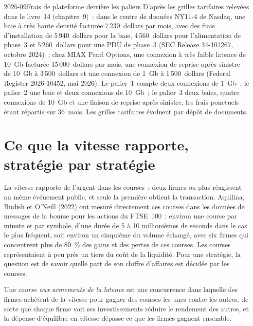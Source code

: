 \begin{dated}{2026-09}{Frais de plateforme derrière les paliers}\label{dat:fm:technology-strategy:fees}
D'après les grilles tarifaires relevées dans le livre~14 (chapitre~9)~: dans le centre de données NY11-4 de Nasdaq, une baie à très haute densité facturée 7\,230~dollars par mois,
avec des frais d'installation de 5\,940~dollars pour la baie, 4\,560~dollars pour l'alimentation de phase~3 et 5\,260~dollars pour une PDU de phase~3 (SEC Release 34-101267, octobre
2024)~; chez MIAX Pearl Options, une connexion à très faible latence de 10~Gb facturée 15\,000~dollars par mois, une connexion de reprise après sinistre de 10~Gb à 3\,500~dollars et une connexion de 1~Gb
à 1\,500~dollars (Federal Register 2026-10452, mai 2026). Le palier~1 compte deux connexions de 1~Gb~; le palier~2 une baie et deux connexions de 10~Gb~; le palier~3
deux baies, quatre connexions de 10~Gb et une liaison de reprise après sinistre, les frais ponctuels étant répartis sur 36~mois. Les grilles tarifaires évoluent par dépôt de documents.
\end{dated}

\section{Ce que la vitesse rapporte, stratégie par stratégie}

La vitesse rapporte de l'argent dans les courses~: deux firmes ou plus réagissent au même événement public, et seule la première obtient la transaction. Aquilina, Budish et O'Neill
(2022) ont mesuré directement ces courses dans les données de messages de la bourse pour les actions du FTSE~100~: environ une course par minute et par symbole, d'une durée de 5 à 10
millionièmes de seconde dans le cas le plus fréquent, soit environ un cinquième du volume échangé, avec six firmes qui concentrent plus de 80~\% des gains et des pertes de ces courses. Les courses
représentaient à peu près un tiers du coût de la liquidité. Pour une stratégie, la question est de savoir quelle part de son chiffre d'affaires est décidée par les courses.

\begin{definition}\label{def:fm:technology-strategy:race}
Une \emph{course aux armements de la latence} est une concurrence dans laquelle des firmes achètent de la vitesse pour gagner des courses les unes contre les autres, de sorte que chaque firme
voit ses investissements réduire le rendement des autres, et la dépense d'équilibre en vitesse dépasse ce que les firmes gagnent ensemble.
\end{definition}

